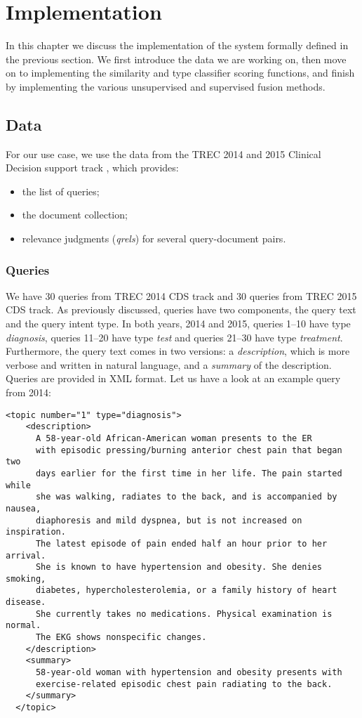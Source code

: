\chapter{Implementation}\label{impl}

In this chapter we discuss the implementation of the system formally defined in the previous section. We first
introduce the data we are working on, then move on to implementing the similarity and type classifier scoring functions,
and finish by implementing the various unsupervised and supervised fusion methods.

\section{Data}
For our use case, we use the data from the TREC 2014 and 2015 Clinical Decision support track \cite{trec}, which provides:
\begin{itemize}
 \item the list of queries;
 \item the document collection;
 \item relevance judgments (\emph{qrels}) for several query-document pairs.
\end{itemize}

\subsection{Queries}
We have 30 queries from TREC 2014 CDS track and 30 queries from TREC 2015 CDS track.
As previously discussed, queries have two components, the query text and the query intent type.
In both years, 2014 and 2015, queries 1--10 have type \emph{diagnosis}, queries 11--20 have type \emph{test}
and queries 21--30 have type \emph{treatment}.
Furthermore, the query text comes in two versions: a \emph{description}, which is more verbose and written in natural language,
and a \emph{summary} of the description. Queries are provided in XML format. 
Let us have a look at an example query from 2014:

\begin{Verbatim}[fontsize=\small]
  <topic number="1" type="diagnosis">
    <description>
      A 58-year-old African-American woman presents to the ER
      with episodic pressing/burning anterior chest pain that began two
      days earlier for the first time in her life. The pain started while
      she was walking, radiates to the back, and is accompanied by nausea,
      diaphoresis and mild dyspnea, but is not increased on inspiration.
      The latest episode of pain ended half an hour prior to her arrival.
      She is known to have hypertension and obesity. She denies smoking,
      diabetes, hypercholesterolemia, or a family history of heart disease.
      She currently takes no medications. Physical examination is normal.
      The EKG shows nonspecific changes.
    </description>
    <summary>
      58-year-old woman with hypertension and obesity presents with
      exercise-related episodic chest pain radiating to the back.
    </summary>
  </topic>
\end{Verbatim}

